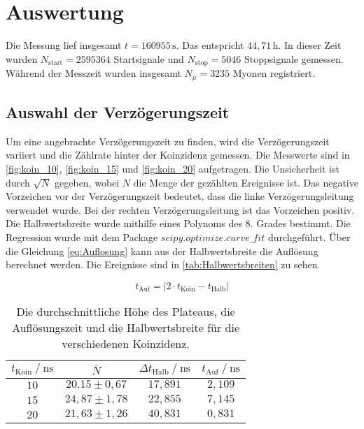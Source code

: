 \section{Auswertung}
\label{sec:auswertung}


Die Messung lief insgesamt $t = 160955 \, \unit{\second}$. Das entspricht $44,71 \, \unit{\hour}$. In dieser Zeit wurden $N_\text{start} = 2595364$ Startsignale und $N_\text{stop} = 5046$ Stoppsignale gemessen.
Während der Messzeit wurden insgesamt $N_{\mu} = 3235 $ Myonen registriert.

\subsection{Auswahl der Verzögerungszeit}
\label{sec:Verzögerungszeit}
Um eine angebrachte Verzögerungszeit zu finden, wird die Verzögerungszeit variiert und die Zählrate hinter der Koinzidenz gemessen.
Die Messwerte sind in \autoref{fig:koin_10}, \autoref{fig:koin_15} und \autoref{fig:koin_20} aufgetragen. Die Unsicherheit ist durch $ \sqrt{N}$ gegeben, wobei $N$ die Menge der gezählten Ereignisse ist.
Das negative Vorzeichen vor der Verzögerungszeit bedeutet, dass die linke Verzögerungsleitung verwendet wurde. Bei der rechten Verzögerungsleitung ist das Vorzeichen positiv.
Die Halbwertsbreite wurde mithilfe eines Polynoms des 8. Grades bestimmt. Die Regression wurde mit dem Package $scipy.optimize.curve\_ fit $  \cite{scipyop} durchgeführt. %
Über die Gleichung \eqref{eq:Auflosung} kann aus der Halbwertsbreite die Auflösung berechnet werden. Die Ereignisse sind in \autoref{tab:Halbwertsbreiten} zu sehen.

\begin{equation}
    t_\text{Auf} = \left|2 \cdot t_\text{Koin} - t_\text{Halb} \right|
    \label{eq:Auflosung}
\end{equation}

\begin{table}[H]
    \centering
    \caption{Die durchschnittliche Höhe des Plateaus, die Auflösungszeit und die Halbwertsbreite für die verschiedenen Koinzidenz.}
    \label{tab:Halbwertsbreiten}
    \begin{tabular}{c c c c}
    \toprule
     $t_\text{Koin} \mathbin{/} \unit{\nano\second} $ &$\bar{N}$ & $\Delta t_\text{Halb} \mathbin{/} \unit{\nano\second}$ & $t_\text{Auf} \mathbin{/} \unit{\nano\second}$ \\
    \midrule
        $10$&  $20.15 \pm 0,67 $ &  $17,891$ & $2,109$\\ 
        $15$&  $24,87 \pm 1,78 $ &  $22,855$ & $7,145$\\ 
        $20$&  $21,63 \pm 1,26 $ &  $40,831$ & $0,831$\\ 
    \bottomrule
    \end{tabular}
    \end{table}

